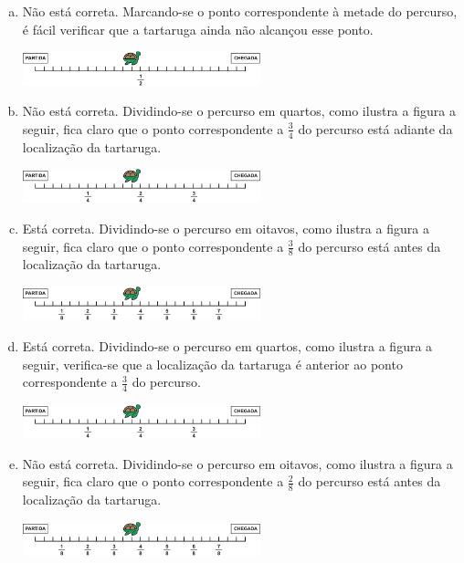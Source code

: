 \begin{multicols}{2}
\begin{solucao}{}{}
\begin{enumerate} [a)] %
  \item Não está correta. Marcando-se o ponto correspondente à metade do percurso, é fácil verificar que a tartaruga ainda não alcançou esse ponto. 
    \begin{center} \includegraphics[width=195pt,keepaspectratio]{../figuras/licao03/ativ9_resp_a}
    \end{center}
  \item  Não está correta. Dividindo-se o percurso em quartos, como ilustra a figura a seguir, fica claro que o ponto correspondente a     $\frac{3}{4}$     do percurso está adiante da localização da tartaruga.
    \begin{center}
 \includegraphics[width=195pt, keepaspectratio]{../figuras/licao03/ativ9_resp_b}
\end{center}
  \item     Está correta. Dividindo-se o percurso em oitavos, como ilustra a figura a seguir, fica claro que o ponto correspondente a     $\frac{3}{8}$     do percurso está antes da localização da tartaruga.
    \begin{center} \includegraphics[width=195pt,keepaspectratio]{../figuras/licao03/ativ9_resp_c} 
    \end{center}
  \item     Está correta. Dividindo-se o percurso em quartos, como ilustra a figura a seguir, verifica-se que a localização da tartaruga é anterior ao ponto correspondente a     $\frac{3}{4}$     do percurso.
    \clearpage
    \begin{center} \includegraphics[width=195pt, keepaspectratio]{../figuras/licao03/ativ9_resp_d}
    \end{center}

  \item     Não está correta. Dividindo-se o percurso em oitavos, como ilustra a figura a seguir, fica claro que o ponto correspondente a     $\frac{2}{8}$     do percurso está antes da localização da tartaruga. 
    \begin{center}
      \includegraphics[width=195pt, keepaspectratio]{../figuras/licao03/ativ9_resp_e}
    \end{center}
    

\end{enumerate}
\end{solucao}
\end{multicols}
